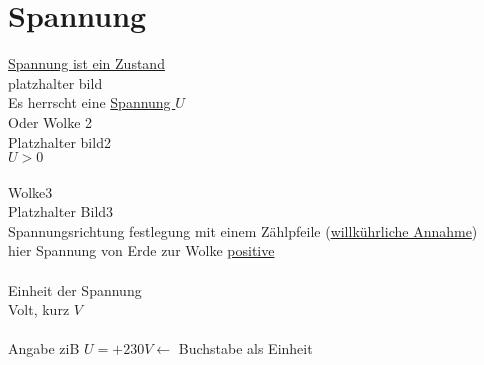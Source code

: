 \section{Spannung}
\underline{Spannung ist ein Zustand}\\
platzhalter bild\\
Es herrscht eine \underline{Spannung $U$}\\
Oder Wolke 2\\
Platzhalter bild2\\
$ U > 0 $\\
\\

Wolke3\\
Platzhalter Bild3\\

Spannungsrichtung festlegung mit einem Zählpfeile (\underline{willkührliche Annahme})\\
hier Spannung von Erde zur Wolke \underline{positive}\\
\\
Einheit der Spannung\\
Volt, kurz $V$\\
\\
Angabe ziB $U = + 230 V \leftarrow $ Buchstabe als Einheit\\

\newpage
